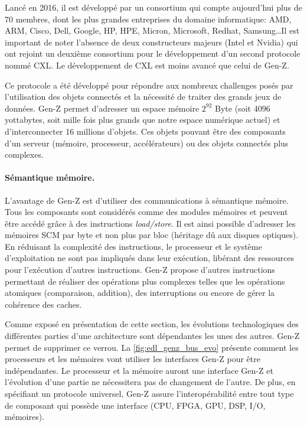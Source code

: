         
        Lancé en 2016, il est développé par un consortium qui compte aujourd'hui plus de 70 membres, dont les plus grandes entreprises du domaine informatique: AMD, ARM, Cisco, Dell, Google, HP, HPE, Micron, Microsoft, Redhat, Samsung\ldots Il est important de noter l'absence de deux constructeurs majeurs (Intel et Nvidia) qui ont rejoint un deuxième consortium pour le développement d'un second protocole nommé CXL. Le développement de CXL est moins avancé que celui de Gen-Z.
        
        Ce protocole a été développé pour répondre aux nombreux challenges posés par l'utilisation des objets connectés et la nécessité de traiter des grands jeux de données. Gen-Z permet d'adresser un espace mémoire $2^{92}$ Byte (soit 4096 yottabytes, soit mille fois plus grands que notre espace numérique actuel) et d’interconnecter 16 millions d'objets. Ces objets pouvant être des composants d'un serveur (mémoire, processeur, accélérateurs) ou des objets connectés plus complexes.
            
    

        \paragraph{Sémantique mémoire.} 
            L'avantage de Gen-Z est d'utiliser des communications à sémantique mémoire. Tous les composants sont considérés comme des modules mémoires et peuvent être accédé grâce à des instructions \textit{load/store}. Il est ainsi possible d'adresser les mémoires SCM par byte et non plus par bloc (héritage dû aux disques optiques). En réduisant la complexité des instructions, le processeur et le système d'exploitation ne sont pas impliqués dans leur exécution, libérant des ressources pour l'exécution d'autres instructions. Gen-Z propose d'autres instructions permettant de réaliser des opérations plus complexes telles que les opérations atomiques (comparaison, addition), des interruptions ou encore de gérer la cohérence des caches.
        
            Comme exposé en présentation de cette section, les évolutions technologiques des différentes parties d'une architecture sont dépendantes les unes des autres. Gen-Z permet de supprimer ce verrou. La \autoref{fig:edl_genz_bus_evo} présente comment les processeurs et les mémoires vont utiliser les interfaces Gen-Z pour être indépendantes. Le processeur et la mémoire auront une interface Gen-Z et l'évolution d'une partie ne nécessitera pas de changement de l'autre. De plus, en spécifiant un protocole universel, Gen-Z assure l'interopérabilité entre tout type de composant qui possède une interface (CPU, FPGA, GPU, DSP, I/O, mémoires).

